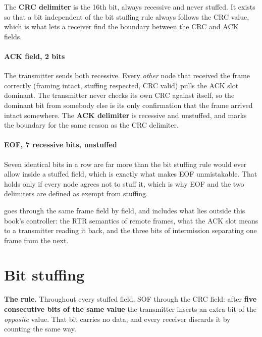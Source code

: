 The \textbf{CRC delimiter} is the 16th bit, always recessive and never stuffed. It exists so that a
bit independent of the bit stuffing rule always follows the CRC value, which is what lets a receiver
find the boundary between the CRC and ACK fields.

\paragraph{ACK field, 2 bits}
The transmitter sends both recessive. Every \emph{other} node that received the frame correctly
(framing intact, stuffing respected, CRC valid) pulls the ACK slot dominant. The transmitter never
checks its own CRC against itself, so the dominant bit from somebody else is its only confirmation
that the frame arrived intact somewhere. The \textbf{ACK delimiter} is recessive and unstuffed, and
marks the boundary for the same reason as the CRC delimiter.

\paragraph{EOF, 7 recessive bits, unstuffed}
Seven identical bits in a row are far more than the bit stuffing rule would ever allow inside a
stuffed field, which is exactly what makes EOF unmistakable. That holds only if every node agrees not
to stuff it, which is why EOF and the two delimiters are defined as exempt from stuffing.

 goes through the same frame field by field, and includes what lies outside this book's
controller: the RTR semantics of remote frames, what the ACK slot means to a transmitter reading it
back, and the three bits of intermission separating one frame from the next.

\section{Bit stuffing}
\label{c10:sec:stuffing}

\textbf{The rule.} Throughout every stuffed field, SOF through the CRC field: after \textbf{five
consecutive bits of the same value} the transmitter inserts an extra bit of the \emph{opposite}
value. That bit carries no data, and every receiver discards it by counting the same way.

